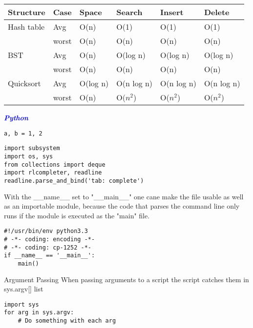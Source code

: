 \documentclass[9pt]{amsart}
\newcommand{\filldots}{\noindent \textbf {\textcolor {blue} {\dotfill}} }
\begin{document}
\begin{multicols}{2}
\begin{center}
    \begin{tabular}{| l | l | p{1.5cm} | p{1.5cm} | p{1.5cm} | p{1.5cm} | }
    \hline
    \textbf {Structure} & \textbf {Case} & \textbf {Space} & \textbf {Search}& \textbf {Insert} & \textbf {Delete}\\ \hline
    Hash table & Avg & O(n) & O(1) &O(1)&O(1) \\ \hline
   & worst & O(n) & O(n) &O(n)&O(n) \\ \hline
    BST & Avg & O(n) & O(log n) &O(log n)&O(log n) \\ \hline
   & worst & O(n) & O(n) &O(n)&O(n) \\ \hline
    Quicksort & Avg & O(log n) & O(n log n) &O(n log n)&O(n log n) \\ \hline
   & worst & O(n) &O($n^2$) &O($n^2$)&O($n^2$) \\ \hline
    \hline
    \end{tabular}
\end{center}


\filldots 

\noindent \textbf {\textcolor {blue} {\em Python}} 

\noindent {\textcolor {blue} {\em Variables}}   
\begin{lstlisting}
a, b = 1, 2
\end{lstlisting}

\noindent {\textcolor {blue} {\em Imports}} 

\begin{lstlisting}
import subsystem
import os, sys
from collections import deque
import rlcompleter, readline
readline.parse_and_bind('tab: complete')
\end{lstlisting}

\noindent {\textcolor {blue} {\em Env \& Progs}}
With the \_\_name\_\_ set to "\_\_main\_\_" one cane make the file usable as well as an importable module, because the code that parses the command line only runs if the module is executed as the "main" file.
\begin{lstlisting}
#!/usr/bin/env python3.3
# -*- coding: encoding -*-
# -*- coding: cp-1252 -*-
if __name__ == '__main__':
	main()
\end{lstlisting}
Argument Passing 
When passing arguments to a script the script catches them in sys.argv[] list 
\begin{lstlisting}
import sys
for arg in sys.argv:
	# Do something with each arg
\end{lstlisting}


\end{multicols}
\end{document}
